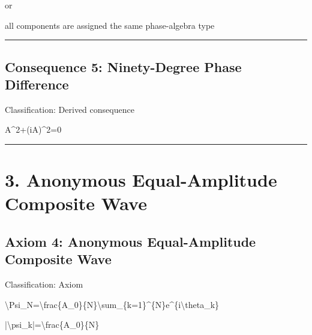 \documentclass[
  a4paper,
]{article}
\newenvironment{Shaded}{}{}
\newcommand{\NormalTok}[1]{#1}
\begin{document}
or

\begin{Shaded}
\begin{Highlighting}[]
\NormalTok{all components are assigned the same phase{-}algebra type}
\end{Highlighting}
\end{Shaded}

\begin{center}\rule{0.5\linewidth}{0.5pt}\end{center}

\subsection{Consequence 5: Ninety-Degree Phase
Difference}\label{consequence-5-ninety-degree-phase-difference}

Classification: Derived consequence

\begin{Shaded}
\begin{Highlighting}[]
\NormalTok{A\^{}2+(iA)\^{}2=0}
\end{Highlighting}
\end{Shaded}

\begin{center}\rule{0.5\linewidth}{0.5pt}\end{center}

\section{3. Anonymous Equal-Amplitude Composite
Wave}\label{anonymous-equal-amplitude-composite-wave}

\subsection{Axiom 4: Anonymous Equal-Amplitude Composite
Wave}\label{axiom-4-anonymous-equal-amplitude-composite-wave}

Classification: Axiom

\begin{Shaded}
\begin{Highlighting}[]
\NormalTok{\textbackslash{}Psi\_N=\textbackslash{}frac\{A\_0\}\{N\}\textbackslash{}sum\_\{k=1\}\^{}\{N\}e\^{}\{i\textbackslash{}theta\_k\}}
\end{Highlighting}
\end{Shaded}

\begin{Shaded}
\begin{Highlighting}[]
\NormalTok{|\textbackslash{}psi\_k|=\textbackslash{}frac\{A\_0\}\{N\}}
\end{Highlighting}
\end{Shaded}
\end{document}
